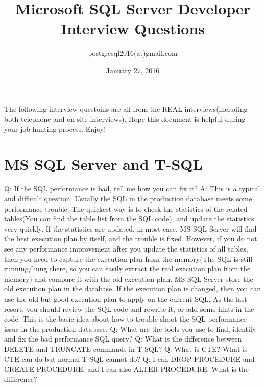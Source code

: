 \documentclass[a4paper,11pt]{article}
\begin{document}
\title{Microsoft SQL Server Developer Interview Questions}
\author{postgresql2016(at)gmail.com}
\date{January 27, 2016}
\maketitle
The following interview questoins are all from the REAL interviews(including both telephone and on-site interviews). Hope this document is helpful during your job hunting process. Enjoy!
\section{MS SQL Server and T-SQL}
Q: \ul{If the SQL performance is bad, tell me how you can fix it?} \newline
A: This is a typical and difficult question. Usually the SQL in the production database meets some performance trouble. The quickest way is to check the statistics of the related tables(You can find the table list from the SQL code), and update the statistics very quickly. If the statistics are updated, in most case, MS SQL Server will find the best execution plan by itself, and the trouble is fixed. However, if you do not see any performance improvement after you update the statistics of all tables, then you need to capture the execution plan from the memory(The SQL is still running/hung there, so you can easily extract the real execution plan from the memory) and compare it with the old execution plan. MS SQL Server store the old execution plan in the database. If the execution plan is changed, then you can use the old but good execution plan to apply on the current SQL. As the last resort, you should review the SQL code and rewrite it, or add some hints in the code. This is the basic idea about how to trouble shoot the SQL performance issue in the production database.\newline \newline
\noindent 
Q: What are the tools you use to find, identify and fix the bad performance SQL query? \newline \newline
\noindent 
Q: What is the difference between DELETE and TRUNCATE commands in T-SQL? \newline \newline
\noindent 
Q: What is CTE? What is CTE can do but normal T-SQL cannot do?\newline \newline
\noindent 
Q: I can DROP PROCEDURE and CREATE PROCEDURE, and I can also ALTER PROCEDURE. What is the difference? \newline \newline
\end{document}
